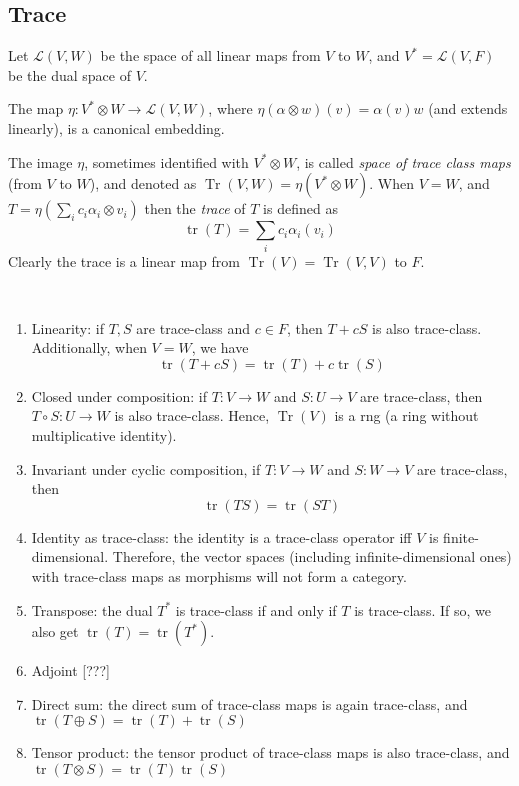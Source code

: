 \documentclass{treatise}
\begin{document}
\begin{shaded}
\subsection{Trace}
Let $\mathcal{L}(V, W)$ be the space of all linear maps from $V$ to $W$, and $V^* = \mathcal{L} (V, F)$ be the dual space of $V$.
\begin{theorem}
The map $\eta : V^* \otimes W \to \mathcal{L}(V, W)$, where $\eta(\alpha \otimes w)(v) = \alpha(v) w$ (and extends linearly), is a canonical embedding.
\end{theorem}
The image $\eta$, sometimes identified with $V^* \otimes W$, is called \emph{space of trace class maps} (from $V$ to $W$), and denoted as $\operatorname{Tr}(V, W) = \eta(V^* \otimes W)$. When $V = W$, and $T = \eta \left( \sum_i c_i \alpha_i \otimes v_i \right)$ then the \emph{trace} of $T$ is defined as
$$\operatorname{tr}(T) = \sum_i c_i \alpha_i(v_i)$$
Clearly the trace is a linear map from $\operatorname{Tr}(V) = \operatorname{Tr}(V, V)$ to $F$.
\begin{proposition} \ 
\begin{enumerate}
	\item Linearity: if $T, S$ are trace-class and $c \in F$, then $T + cS$ is also trace-class. Additionally, when $V = W$, we have
	$$\operatorname{tr}(T + cS) = \operatorname{tr}(T) + c \operatorname{tr}(S)$$
	\item Closed under composition: if $T: V \to W$ and $S : U \to V$ are trace-class, then $T \circ S : U \to W$ is also trace-class. Hence, $\operatorname{Tr}(V)$ is a rng (a ring without multiplicative identity).
	\item Invariant under cyclic composition, if $T: V \to W$ and $S: W \to V$ are trace-class, then
	$$\operatorname{tr}(TS) = \operatorname{tr}(ST)$$
	\item Identity as trace-class: the identity is a trace-class operator iff $V$ is finite-dimensional. Therefore, the vector spaces (including infinite-dimensional ones) with trace-class maps as morphisms will not form a category.
	\item Transpose: the dual $T^*$ is trace-class if and only if $T$ is trace-class. If so, we also get $\operatorname{tr}(T) = \operatorname{tr}(T^*)$.
	\item Adjoint [???]
	\item Direct sum: the direct sum of trace-class maps is again trace-class, and $\operatorname{tr}(T \oplus S) = \operatorname{tr}(T) + \operatorname{tr}(S)$
	\item Tensor product: the tensor product of trace-class maps is also trace-class, and $\operatorname{tr}(T \otimes S) = \operatorname{tr}(T) \operatorname{tr}(S)$

\end{enumerate}
\end{proposition}
\end{shaded}
\end{document}
